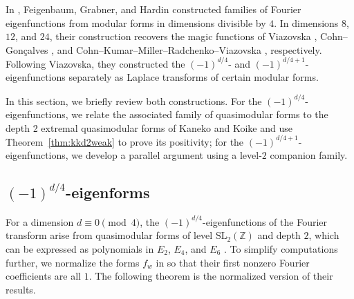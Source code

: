\documentclass[10pt,reqno]{amsproc}
\newcommand{\SL}{\mathrm{SL}}
\newcommand{\bZ}{\mathbb{Z}}
\newcommand{\1}{\mathds{1}}	%
\theoremstyle{definition}
\theoremstyle{remark}
\begin{document}
In \cite{feigenbaum2021eigenfunctions}, Feigenbaum, Grabner, and Hardin constructed families of Fourier eigenfunctions from modular forms in dimensions divisible by $4$.
In dimensions $8$, $12$, and $24$, their construction recovers the magic functions of Viazovska \cite{viazovska2017sphere}, Cohn--Gon{\c{c}}alves \cite{cohn2019optimal}, and Cohn--Kumar--Miller--Radchenko--Viazovska \cite{cohn2017sphere}, respectively.
Following Viazovska, they constructed the $(-1)^{d/4}$- and $(-1)^{d/4 + 1}$-eigenfunctions separately as Laplace transforms of certain modular forms.

In this section, we briefly review both constructions.
For the $(-1)^{d/4}$-eigenfunctions, we relate the associated family of quasimodular forms to the depth 2 extremal quasimodular forms of Kaneko and Koike \cite{kaneko2006extremal} and use Theorem~\ref{thm:kkd2weak} to prove its positivity; for the $(-1)^{d/4+1}$-eigenfunctions, we develop a parallel argument using a level-$2$ companion family.

\subsection{$(-1)^{d/4}$-eigenforms}
\label{sec:fgh_poseig}

For a dimension $d \equiv 0\pmod{4}$, the $(-1)^{d/4}$-eigenfunctions of the Fourier transform arise from quasimodular forms of level $\SL_2(\bZ)$ and depth $2$, which can be expressed as polynomials in $E_2$, $E_4$, and $E_6$ \cite[Theorem 3.2 and Propositions 5.1 and 5.3]{feigenbaum2021eigenfunctions}.
To simplify computations further, we normalize the forms $f_w$ in \cite{feigenbaum2021eigenfunctions} so that their first nonzero Fourier coefficients are all $1$.
The following theorem is the normalized version of their results.
\end{document}

